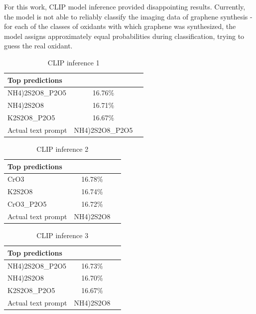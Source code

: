 \documentclass[runningheads]{llncs}
\begin{document}
For this work, CLIP model inference provided disappointing results. Currently, the model is not able to reliably classify the imaging data of graphene synthesis - for each of the classes of oxidants with which graphene was synthesized, the model assigns approximately equal probabilities during classification, trying to guess the real oxidant.
\\
\begin{minipage}{0.5\textwidth}
    \begin{table}[H]
        \centering
        \caption{CLIP inference 1}
        {\begin{tabular}{|l|c|c|} 
            \hline
            Top predictions & \\
            \hline
            NH4)2S2O8\_P2O5 & 16.76\% \\
            \hline
            NH4)2S2O8 & 16.71\% \\
            \hline
            K2S2O8\_P2O5 & 16.67\% \\
            \hline
            Actual text prompt & NH4)2S2O8\_P2O5 \\
            \hline
        \end{tabular}}
        \label{tab:clip_inference_example_1}
    \end{table}
\end{minipage}
\hfill
\begin{minipage}{0.5\textwidth}
    \begin{table}[H]
        \centering
        \caption{CLIP inference 2}
        {\begin{tabular}{|l|c|c|} 
            \hline
            Top predictions & \\
            \hline
            CrO3 & 16.78\% \\
            \hline
            K2S2O8 & 16.74\% \\
            \hline
            CrO3\_P2O5 & 16.72\% \\
            \hline
            Actual text prompt & NH4)2S2O8 \\
            \hline
        \end{tabular}}
        \label{tab:clip_inference_example_2}
    \end{table}
\end{minipage}
\hfill
\begin{minipage}{1.0\textwidth}
    \begin{table}[H]
        \centering
        \caption{CLIP inference 3}
        {\begin{tabular}{|l|c|c|} 
            \hline
            Top predictions & \\
            \hline
            NH4)2S2O8\_P2O5 & 16.73\% \\
            \hline
            NH4)2S2O8 & 16.70\% \\
            \hline
            K2S2O8\_P2O5 & 16.67\% \\
            \hline
            Actual text prompt & NH4)2S2O8 \\
            \hline
        \end{tabular}}
        \label{tab:clip_inference_example_3}
    \end{table}
\end{minipage}
\end{document}

